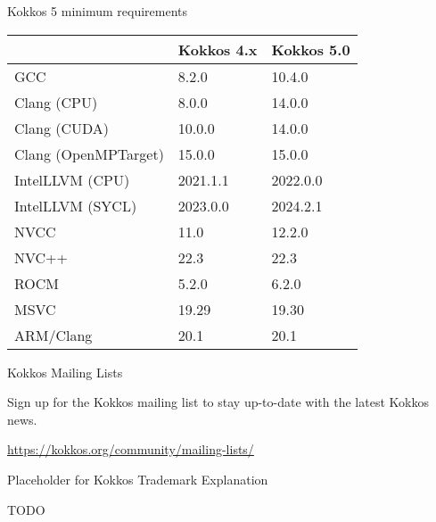 \begin{frame}[fragile]{Kokkos 5 minimum requirements}

\begin{table}[]
\begin{tabular}{lll}
\multicolumn{1}{r}{} & Kokkos 4.x & Kokkos 5.0 \\ \hline
GCC                  & 8.2.0      & 10.4.0     \\
Clang (CPU)          & 8.0.0      & 14.0.0     \\
Clang (CUDA)         & 10.0.0     & 14.0.0     \\
Clang (OpenMPTarget) & 15.0.0     & 15.0.0     \\
IntelLLVM (CPU)      & 2021.1.1   & 2022.0.0   \\
IntelLLVM (SYCL)     & 2023.0.0   & 2024.2.1   \\
NVCC                 & 11.0       & 12.2.0     \\
NVC++                & 22.3       & 22.3       \\
ROCM                 & 5.2.0      & 6.2.0      \\
MSVC                 & 19.29      & 19.30      \\
ARM/Clang            & 20.1       & 20.1       \\ \hline
\end{tabular}
\end{table}

\end{frame}


\begin{frame}[fragile]{Kokkos Mailing Lists}

\vspace{0.5cm}
\begin{center}
Sign up for the Kokkos mailing list to stay up-to-date with the latest Kokkos news.
\end{center}

\vspace{0.5cm}

\begin{center}
\url{https://kokkos.org/community/mailing-lists/}
\end{center}

\end{frame}


\begin{frame}[fragile]{Placeholder for Kokkos Trademark Explanation}

TODO

\end{frame}

